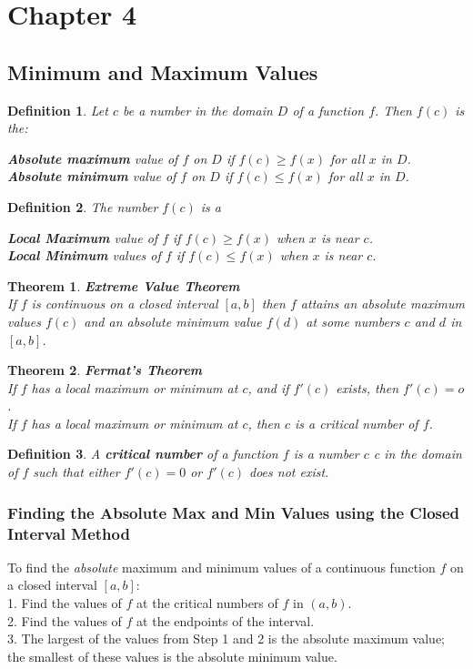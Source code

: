 \documentclass[10pt,a4paper]{article}
\newtheorem{theorem}{Theorem}
\newtheorem{definition}{Definition}
\begin{document}
	\section{Chapter 4}
	\subsection{Minimum and Maximum Values}
	\begin{definition}
		Let $c$ be a number in the domain $D$ of a function $f$. Then $f(c)$ is the:
		\begin{center}
			\textbf{Absolute maximum} value of $f$ on $D$ if $f(c) \geq f(x) $ for all $x$ in $D$.
			\\		\textbf{Absolute minimum} value of $f$ on $D$ if $f(c) \leq f(x) $ for all $x$ in $D$.
		\end{center}
	\end{definition}
	\begin{definition}
		The number $f(c)$ is a
		\begin{center}
			\textbf{Local Maximum} value of $f$ if $f(c) \geq f(x)$ when $x$ is near $c$.
			\\		\textbf{Local Minimum} values of $f$ if $f(c) \leq f(x)$ when $x$ is near $c$.
		\end{center}
	\end{definition}
	\begin{theorem}
		\textbf{Extreme Value Theorem}
		\\	If $f$ is continuous on a closed interval $[a,b]$ then $f$ attains an absolute maximum values $f(c)$ and an absolute minimum value $f(d)$ at some numbers $c$ and $d$ in $[a,b]$.
	\end{theorem}
	\begin{theorem}
		\textbf{Fermat's Theorem}
		\\	If $f$ has a local maximum or minimum at $c$, and if $f'(c)$ exists, then $f'(c)=o$.
		\\If $f$ has a local maximum or minimum at $c$, then $c$ is a critical number of $f$.
	\end{theorem}
	\begin{definition}
		A \textbf{critical number} of a function $f$ is a number $c$ c in the domain of $f$ such that either $f'(c)=0$ or $f'(c)$ does not exist.
	\end{definition}
	\subsubsection{Finding the Absolute Max and Min Values using the Closed Interval Method}
	To find the \textit{absolute} maximum and minimum values of a continuous function $f$ on a closed interval $[a,b]$:
	\\1. Find the values of $f$ at the critical numbers of $f$ in $(a,b)$.
	\\2. Find the values of $f$ at the endpoints of the interval.
	\\3. The largest of the values from Step 1 and 2 is the absolute maximum value; the smallest of these values is the absolute minimum value.
	
\end{document}
